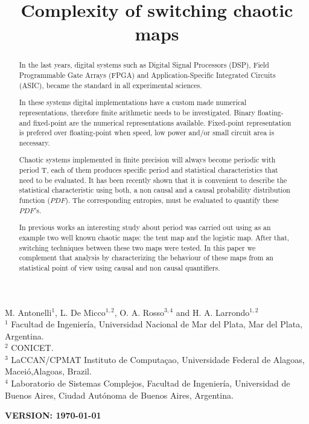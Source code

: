 \begin{frontmatter}

	\title{Complexity of switching chaotic maps}
	M. Antonelli$^{1}$, L. De Micco$^{1,2}$, O. A. Rosso$^{3,4}$ and H. A. Larrondo$^{1,2}$\\
	$^{1}$ Facultad de Ingenier\'ia, Universidad Nacional de Mar del Plata, Mar del Plata, Argentina.\\
	$^{2}$ CONICET.\\
	$^{3}$ LaCCAN/CPMAT Instituto de Computa\c{c}ao, Universidade Federal de Alagoas, Macei\'o,Alagoas, Brazil.\\
	$^{4}$ Laboratorio de Sistemas Complejos, Facultad de
	Ingenier\'ia, Universidad de Buenos Aires, Ciudad Aut\'onoma de
	Buenos Aires, Argentina.

\begin{abstract}
In the last years, digital systems such as Digital Signal Processors (DSP), Field Programmable Gate Arrays (FPGA) and Application-Specific Integrated Circuits (ASIC), became the standard in all experimental sciences.

In these systems digital implementations have a custom made numerical representations, therefore finite arithmetic needs to be investigated.
Binary floating- and fixed-point are the numerical representations available.
Fixed-point representation is prefered over floating-point when speed, low power and/or small circuit area is necessary.

Chaotic systems implemented in finite precision will always become periodic with period T, each of them produces specific period and statistical characteristics that need to be evaluated.
It has been recently shown that it is convenient to describe the statistical characteristic using both, a non causal and a causal probability distribution function ($PDF$).
The corresponding entropies, must be evaluated to quantify these $PDF$'s. 

In previous works an interesting study about period was carried out using as an example two well known chaotic maps: the tent map and the logistic map.
After that, switching techniques between these two maps were tested.
In this paper we complement that analysis by characterizing the behaviour of these maps from an statistical point of view using causal and non causal quantifiers.

\end{abstract}
\maketitle
\end{frontmatter}
{\bf VERSION: \today}